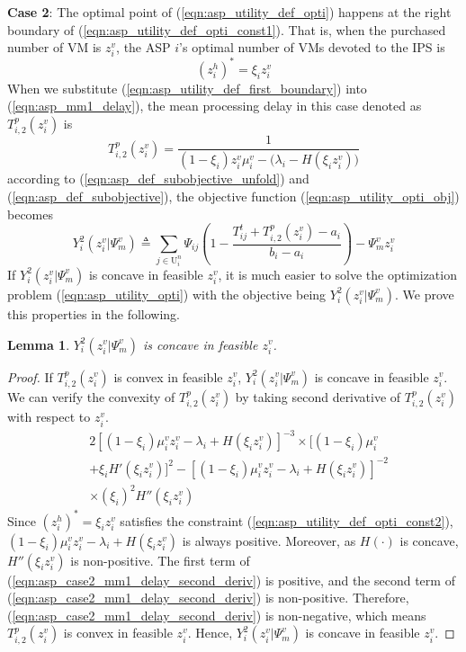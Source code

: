 \documentclass[conference]{IEEEtran}
\newtheorem{lemma}{Lemma}
\begin{document}
\textbf{Case 2}: The optimal point of (\ref{eqn:asp_utility_def_opti}) happens at the right boundary of (\ref{eqn:asp_utility_def_opti_const1}). That is, when the purchased number of VM is $z_i^v$, the ASP $i$'s optimal number of VMs devoted to the IPS is
\begin{equation} \label{eqn:asp_utility_def_first_boundary}
(z_i^h)^* = \xi_i z_i^v
\end{equation}
When we substitute (\ref{eqn:asp_utility_def_first_boundary}) into (\ref{eqn:asp_mm1_delay}), the mean processing delay in this case denoted as $T_{i,2}^p(z_i^v)$ is
\begin{equation} \label{eqn:asp_case2_mm1_delay}
T_{i,2}^p(z_i^v) =  \frac{1}{(1-\xi_i)z_i^v\mu_i^v - \big(\lambda_i - H(\xi_iz_i^v)\big)}
\end{equation}
according to (\ref{eqn:asp_def_subobjective_unfold}) and (\ref{eqn:asp_def_subobjective}), the objective function (\ref{eqn:asp_utility_opti_obj}) becomes
\begin{equation} \label{eqn:asp_case2_objective}
Y_i^2(z_i^v|\Psi_m^v) \triangleq \sum_{j \in \mathrm{U}_i^n}\Psi_{ij}(1-\frac{T_{ij}^t + T_{i,2}^p(z_i^v)-a_i}{b_i-a_i}) - \Psi_m^vz_i^v
\end{equation}
If $Y_i^2(z_i^v|\Psi_m^v)$ is concave in feasible $z_i^v$, it is much easier to solve the optimization problem (\ref{eqn:asp_utility_opti}) with the objective being $Y_i^2(z_i^v|\Psi_m^v)$. We prove this properties in the following. 
\begin{lemma} \label{lemma:asp_case2_utility_concave}
$Y_i^2(z_i^v|\Psi_m^v)$ is concave in feasible $z_i^v$.
\end{lemma}
\begin{proof}
If $T_{i,2}^p(z_i^v)$ is convex in feasible $z_i^v$, $Y_i^2(z_i^v|\Psi_m^v)$ is concave in feasible $z_i^v$. We can verify the convexity of $T_{i,2}^p(z_i^v)$ by taking second derivative of $T_{i,2}^p(z_i^v)$ with respect to $z_i^v$. 
\begin{equation} \label{eqn:asp_case2_mm1_delay_second_deriv}
\begin{aligned}
&2[(1-\xi_i)\mu_i^v z_i^v - \lambda_i + H(\xi_i z_i^v)]^{-3}\times [(1-\xi_i)\mu_i^v\\
&+ \xi_i H'(\xi_i z_i^v)]^2-[(1-\xi_i)\mu_i^v z_i^v - \lambda_i + H(\xi_i z_i^v)]^{-2}  \\
& \times (\xi_i)^2 H''(\xi_i z_i^v)
\end{aligned}{}
\end{equation}
Since $(z_i^h)^* = \xi_i z_i^v$ satisfies the constraint (\ref{eqn:asp_utility_def_opti_const2}), $(1-\xi_i)\mu_i^v z_i^v - \lambda_i + H(\xi_i z_i^v)$ is always positive. Moreover, as $H(\cdot)$ is concave, $H''(\xi_i z_i^v)$ is non-positive. The first term of (\ref{eqn:asp_case2_mm1_delay_second_deriv}) is positive, and the second term of (\ref{eqn:asp_case2_mm1_delay_second_deriv}) is non-positive. Therefore, (\ref{eqn:asp_case2_mm1_delay_second_deriv}) is non-negative, which means $T_{i,2}^p(z_i^v)$ is convex in feasible $z_i^v$. Hence, $Y_i^2(z_i^v|\Psi_m^v)$ is concave in feasible $z_i^v$. \qedhere
\end{proof}
\end{document}
